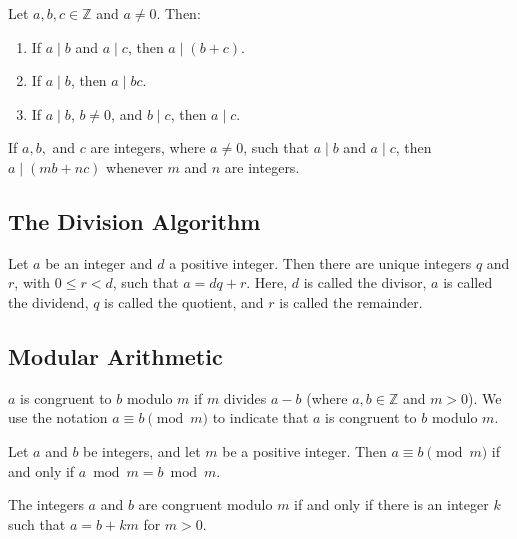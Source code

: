 \documentclass{article}
\begin{document}
\begin{theorem}
    Let \( a, b, c \in \mathbb{Z} \) and \( a \neq 0 \). Then:
    \begin{enumerate}
        \item If \( a \mid b \) and \( a \mid c \), then \( a \mid (b + c) \).
        \item If \( a \mid b \), then \( a \mid bc \).
        \item If \( a \mid b \), \( b \neq 0 \), and \( b \mid c \), then \( a \mid c \).
    \end{enumerate}
\end{theorem}

\begin{proposition}
    If \( a, b, \) and \( c \) are integers, where \( a \neq 0 \), such that \( a \mid b \) and \( a \mid c \), then \( a \mid (mb + nc) \) whenever \( m \) and \( n \) are integers.
\end{proposition}

\subsection{The Division Algorithm}
\begin{theorem}
    Let \( a \) be an integer and \( d \) a positive integer. Then there are unique integers \( q \) and \( r \), with \( 0 \leq r < d \), such that \( a = dq + r \).
    Here, \( d \) is called the divisor, \( a \) is called the dividend, \( q \) is called the quotient, and \( r \) is called the remainder.
\end{theorem}

\subsection{Modular Arithmetic}
\begin{definition}
    \( a \) is congruent to \( b \) modulo \( m \) if \( m \) divides \( a - b \) (where \( a, b \in \mathbb{Z} \) and \( m > 0 \)).
    We use the notation \( a \equiv b \pmod{m} \) to indicate that \( a \) is congruent to \( b \) modulo \( m \).
\end{definition}

\begin{theorem}
    Let \( a \) and \( b \) be integers, and let \( m \) be a positive integer. Then \( a \equiv b \pmod{m} \) if and only if \( a \bmod m = b \bmod m \).
\end{theorem}

\begin{theorem}
    The integers \( a \) and \( b \) are congruent modulo \( m \) if and only if there is an integer \( k \) such that \( a = b + km \) for \( m > 0 \).
\end{theorem}
\end{document}
